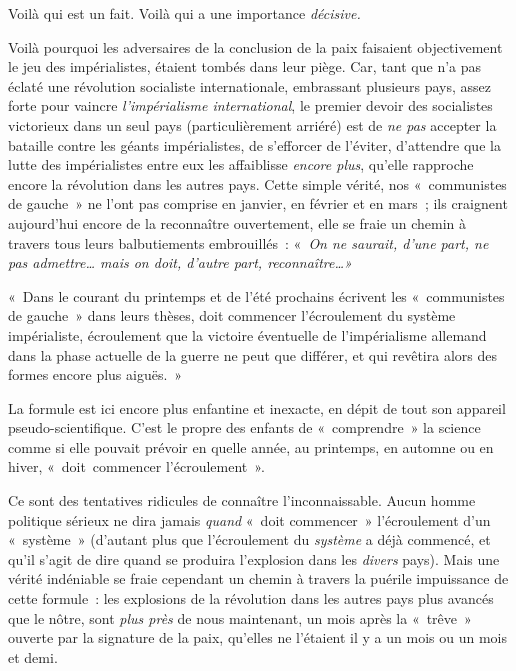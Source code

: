 \documentclass[french,twoside]{book} %
\begin{document}
\bigbreak
\noindent Voilà qui est un fait. Voilà qui a une importance \emph{décisive.}\par
Voilà pourquoi les adversaires de la conclusion de la paix faisaient objectivement le jeu des impérialistes, étaient tombés dans leur piège. Car, tant que n’a pas éclaté une révolution socialiste internationale, embrassant plusieurs pays, assez forte pour vaincre \emph{l’impérialisme international}, le premier devoir des socialistes victorieux dans un seul pays (particulièrement arriéré) est de \emph{ne pas} accepter la bataille contre les géants impérialistes, de s’efforcer de l’éviter, d’attendre que la lutte des impérialistes entre eux les affaiblisse \emph{encore plus}, qu’elle rapproche encore la révolution dans les autres pays. Cette simple vérité, nos « communistes de gauche » ne l’ont pas comprise en janvier, en février et en mars ; ils craignent aujourd’hui encore de la reconnaître ouvertement, elle se fraie un chemin à travers tous leurs balbutiements embrouillés : « \emph{On ne saurait, d’une part, ne pas admettre… mais on doit, d’autre part, reconnaître…»}\par
« Dans le courant du printemps et de l’été prochains écrivent les « communistes de gauche » dans leurs thèses, doit commencer l’écroulement du système impérialiste, écroulement que la victoire éventuelle de l’impérialisme allemand dans la phase actuelle de la guerre ne peut que différer, et qui revêtira alors des formes encore plus aiguës. »\par
La formule est ici encore plus enfantine et inexacte, en dépit de tout son appareil pseudo-­scientifique. C'est le propre des enfants de « comprendre » la science comme si elle pouvait prévoir en quelle année, au printemps, en automne ou en hiver, « doit commencer l’écroulement ».\par
Ce sont des tentatives ridicules de connaître l’incon­naissable. Aucun homme politique sérieux ne dira jamais \emph{quand} « doit commencer » l’écroulement d’un « système » (d’autant plus que l’écroulement du \emph{système} a déjà commencé, et qu’il s’agit de dire quand se produira l’explosion dans les \emph{divers} pays). Mais une vérité indéniable se fraie cependant un chemin à travers la puérile impuissance de cette formule : les explosions de la révolution dans les autres pays plus avancés que le nôtre, sont \emph{plus près} de nous maintenant, un mois après la « trêve » ouverte par la signature de la paix, qu’elles ne l’étaient il y a un mois ou un mois et demi.\par
\end{document}
